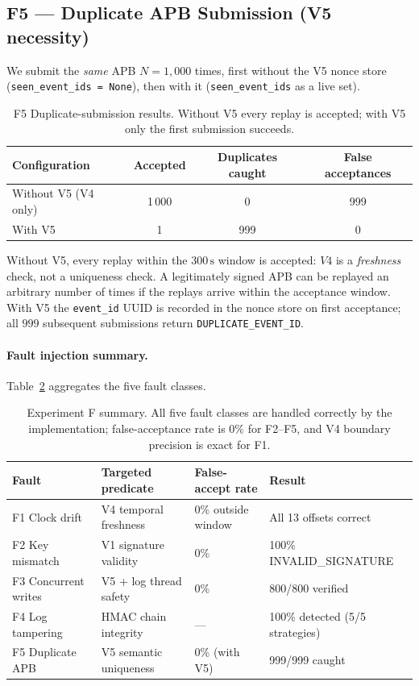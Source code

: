 \documentclass[11pt]{article}
\begin{document}
\subsection*{F5 — Duplicate APB Submission (V5 necessity)}

We submit the \emph{same} APB $N = 1{,}000$ times, first without
the V5 nonce store (\texttt{seen\_event\_ids = None}), then with
it (\texttt{seen\_event\_ids} as a live set).

\begin{table}[h]
\centering
\caption{F5 Duplicate-submission results. Without V5 every replay is
accepted; with V5 only the first submission succeeds.}
\label{tab:exp_f5}
\small
\begin{tabular}{lccc}
\toprule
Configuration & Accepted & Duplicates caught & False acceptances \\
\midrule
Without V5 (V4 only) & 1\,000 & 0   & 999 \\
With V5              & 1      & 999 & 0   \\
\bottomrule
\end{tabular}
\end{table}

Without V5, every replay within the $300\,\mathrm{s}$ window is
accepted: $V4$ is a \emph{freshness} check, not a uniqueness check.
A legitimately signed APB can be replayed an arbitrary number of
times if the replays arrive within the acceptance window.
With V5 the \texttt{event\_id} UUID is recorded in the nonce store
on first acceptance; all $999$ subsequent submissions return
\texttt{DUPLICATE\_EVENT\_ID}.

\paragraph{Fault injection summary.}
Table~\ref{tab:exp_f_summary} aggregates the five fault classes.

\begin{table}[h]
\centering
\caption{Experiment F summary. All five fault classes are handled
correctly by the implementation; false-acceptance rate is $0\%$
for F2--F5, and V4 boundary precision is exact for F1.}
\label{tab:exp_f_summary}
\small
\begin{tabular}{llll}
\toprule
Fault & Targeted predicate & False-accept rate & Result \\
\midrule
F1 Clock drift         & V4 temporal freshness        & 0\% outside window & All 13 offsets correct \\
F2 Key mismatch        & V1 signature validity        & 0\%                & 100\% INVALID\_SIGNATURE \\
F3 Concurrent writes   & V5 + log thread safety       & 0\%                & 800/800 verified \\
F4 Log tampering       & HMAC chain integrity         & ---                & 100\% detected (5/5 strategies) \\
F5 Duplicate APB       & V5 semantic uniqueness       & 0\% (with V5)      & 999/999 caught \\
\bottomrule
\end{tabular}
\end{table}
\end{document}

